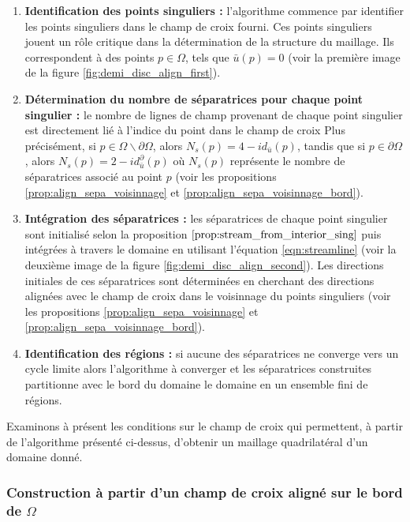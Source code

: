 \begin{enumerate}
\item \textbf{Identification des points singuliers :} l'algorithme commence par identifier les points singuliers dans le champ de croix fourni. Ces points singuliers jouent un rôle critique dans la détermination de la structure du maillage. Ils correspondent à des points $p\in\Omega$, tels que $\bar{u}(p)=0$ (voir la première image de la figure \ref{fig:demi_disc_align_first}).\\
\item \textbf{Détermination du nombre de séparatrices pour chaque point singulier :}
le nombre de lignes de champ provenant de chaque point singulier est directement lié à l'indice du point dans le champ de croix Plus précisément, si $p\in\Omega\backslash\partial\Omega$, alors $N_s(p) = 4 - id_{\bar{u}}(p)$, tandis que si $p\in\partial\Omega$, alors $N_s(p) = 2 - id_{\bar{u}}^\partial(p)$ où $N_s(p)$ représente le nombre de séparatrices associé au point $p$ (voir les propositions \ref{prop:align_sepa_voisinnage} et \ref{prop:align_sepa_voisinnage_bord}).\\
\item \textbf{Intégration des séparatrices :} les séparatrices de chaque point singulier sont initialisé selon la proposition $\ref{prop:stream_from_interior_sing}$ puis intégrées à travers le domaine en utilisant l'équation \eqref{eqn:streamline} (voir la deuxième image de la figure \ref{fig:demi_disc_align_second}). Les directions initiales de ces séparatrices sont déterminées en cherchant des directions alignées avec le champ de croix dans le voisinnage du points singuliers  (voir les propositions \ref{prop:align_sepa_voisinnage} et \ref{prop:align_sepa_voisinnage_bord}).\\
\item \textbf{Identification des régions :} si aucune des séparatrices ne converge vers un cycle limite alors l'algorithme à converger et les séparatrices construites partitionne avec le bord du domaine le domaine en un ensemble fini de régions.\\
\end{enumerate}

Examinons à présent les conditions sur le champ de croix qui permettent, à partir de l'algorithme présenté ci-dessus, d'obtenir un maillage quadrilatéral d'un domaine donné.

\subsubsection*{Construction à partir d'un champ de croix aligné sur le bord de $\Omega$}

